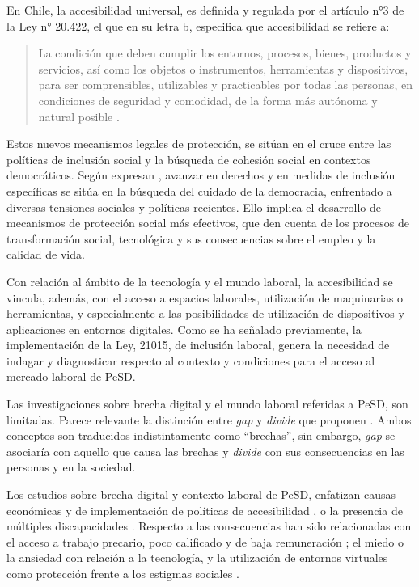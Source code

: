 En Chile, la accesibilidad universal, es definida y regulada por el
artículo n°3 de la Ley n° 20.422, el que en su letra b, especifica que
accesibilidad se refiere a:

\begin{quote}
	La condición que deben cumplir los entornos, procesos, bienes, productos
	y servicios, así como los objetos o instrumentos, herramientas y
	dispositivos, para ser comprensibles, utilizables y practicables por
	todas las personas, en condiciones de seguridad y comodidad, de la forma
	más autónoma y natural posible \cite{MINISTERIODEPLANIFICACION2010}.
\end{quote}

Estos nuevos mecanismos legales de protección, se sitúan en el cruce
entre las políticas de inclusión social y la búsqueda de cohesión social
en contextos democráticos. Según expresan \textcite{MALDONADO2020}, avanzar en derechos y en medidas de inclusión específicas se
sitúa en la búsqueda del cuidado de la democracia, enfrentado a diversas
tensiones sociales y políticas recientes. Ello implica el desarrollo de
mecanismos de protección social más efectivos, que den cuenta de los
procesos de transformación social, tecnológica y sus consecuencias sobre
el empleo y la calidad de vida.

Con relación al ámbito de la tecnología y el mundo laboral, la
accesibilidad se vincula, además, con el acceso a espacios laborales,
utilización de maquinarias o herramientas, y especialmente a las
posibilidades de utilización de dispositivos y aplicaciones en entornos
digitales. Como se ha señalado previamente, la implementación de la Ley,
21015, de inclusión laboral, genera la necesidad de indagar y
diagnosticar respecto al contexto y condiciones para el acceso al
mercado laboral de PeSD.

Las investigaciones sobre brecha digital y el mundo laboral referidas a
PeSD, son limitadas. Parece relevante la distinción entre \emph{gap} y
\emph{divide} que proponen \textcite[p. 2]{LONGORIA2022}. Ambos conceptos son traducidos indistintamente como
\enquote{brechas}, sin embargo, \emph{gap} se asociaría con aquello que causa
las brechas y \emph{divide} con sus consecuencias en las personas y en
la sociedad.

Los estudios sobre brecha digital y contexto laboral de PeSD, enfatizan
causas económicas y de implementación de políticas de accesibilidad
\cite[p. 4440]{LIN2018}, o la presencia de múltiples
discapacidades \cite[p. 734]{SCANLAN2022}. Respecto a las consecuencias han
sido relacionadas con el acceso a trabajo precario, poco calificado y de
baja remuneración \cite[p. 726]{QU2022}; el miedo o la ansiedad con
relación a la tecnología, y la utilización de entornos virtuales como
protección frente a los estigmas sociales \cite[p. 2]{PETHIG2021}.

